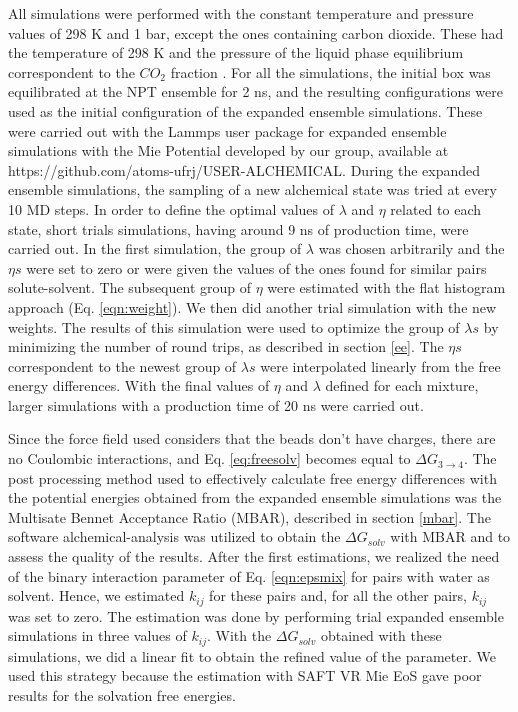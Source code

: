 All simulations were performed with the constant temperature and pressure values of 298 K and 1 bar, except the ones containing carbon dioxide. These had the temperature of 298 K and the pressure of the liquid phase equilibrium correspondent to the $CO_{2}$ fraction \cite{co2toliq}. For all the simulations, the initial box was equilibrated at the NPT ensemble for 2 ns, and the resulting configurations were used as the initial configuration of the expanded ensemble simulations. These were carried out with the Lammps user package for expanded ensemble simulations with the Mie Potential developed by our group, available at https://github.com/atoms-ufrj/USER-ALCHEMICAL. During the expanded ensemble simulations, the sampling of a new alchemical state was tried at every 10 MD steps. In order to define the optimal values of $\lambda$ and $\eta$ related to each state, short trials simulations, having around 9 ns of production time, were carried out. In the first simulation, the group of $\lambda$ was chosen arbitrarily and the $\eta s$ were set to zero or were given the values of the ones found for similar pairs solute-solvent. The subsequent group of $\eta$ were estimated  with the flat histogram approach (Eq. \eqref{eqn:weight}). We then did another trial simulation with the new weights. The results of this simulation were used to optimize the group of $\lambda s$ by minimizing the number of round trips, as described in section \ref{ee}. The $\eta s$ correspondent to the newest group of $\lambda s$ were interpolated linearly from the free energy differences. With the final values of $\eta$ and $\lambda $ defined for each mixture, larger simulations with a production time of 20 ns were carried out. 

Since the force field used considers that the beads don't have charges, there are no Coulombic interactions, and Eq. \eqref{eq:freesolv} becomes equal to $\Delta G_{3 \rightarrow 4} $. The post processing method used to effectively calculate free energy differences with the potential energies obtained from the expanded ensemble simulations was the Multisate Bennet Acceptance Ratio (MBAR), described in section \ref{mbar}. The software alchemical-analysis \cite{klimovich} was utilized to obtain the $\Delta G_{solv}$ with MBAR and to assess the quality of the results. After the first estimations, we realized the need of the binary interaction parameter of Eq. \eqref{eqn:epsmix} for pairs with water as solvent. Hence, we estimated  $k_{ij}$ for these pairs and, for all the other pairs,  $k_{ij}$ was set to zero. The estimation was done by performing trial  expanded ensemble simulations in three values of $k_{ij}$. With the $\Delta G_{solv}$ obtained with these simulations, we did a linear fit to obtain the refined value of the parameter. We used this strategy because the estimation with SAFT VR Mie EoS gave poor results for the solvation free energies.

